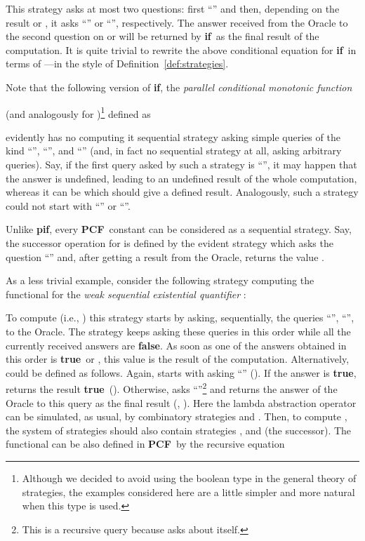 \documentclass[fleqn]{LMCS}
\theoremstyle{plain}\newtheorem{satz}[thm]{Satz}
\theoremstyle{plain}\newtheorem{hyp}[thm]{Hypothesis}
\theoremstyle{plain}\newtheorem{hyps}[thm]{Hypotheses}
\theoremstyle{definition}\newtheorem{note}[thm]{Note}
\newcommand{\PCF}{\mbox{\bf PCF}}
\newcommand{\IF}{\mbox{\bf if}}
\newcommand{\PIF}{\mbox{\bf pif}}
\newcommand{\?}{\mbox{?}}
\newcommand{\false}{\mbox{\bf false}}
\newcommand{\true}{\mbox{\bf true}}
\begin{document}
This strategy asks at most two questions: 
first ``'' and then, depending on the result 
 or ,
it asks ``'' or ``'', respectively. 
The answer received from the Oracle to the second question 
on  or  will be 
returned by \IF\ as the final result of the computation. 
It is quite trivial to rewrite the above conditional equation for \IF\ 
in terms of ---in the style of Definition~\ref{def:strategies}. 

Note that the following version of \IF, the
\emph{parallel conditional monotonic function} 

(and analogously for )\footnote{Although we decided to avoid using the boolean type  in 
the general theory of strategies, the examples considered here are a little simpler 
and more natural when this type is used. 
} 
defined as
 
evidently has no computing it sequential strategy asking simple queries 
of the kind ``'', ``'', and ``'' (and, in fact 
no sequential strategy at all, asking arbitrary queries). 
Say, if the first query asked by such a strategy is ``'', 
it may happen that the answer is undefined, leading to an undefined 
result of the whole computation, whereas it can be  which should 
give a defined result. Analogously, such a strategy could not start with 
``'' or ``''. 


Unlike \PIF, every \PCF\ constant 
can be considered as a sequential strategy. 
Say, the successor operation  for  
is defined by the evident strategy which asks the question ``'' and, 
after getting a result  from the Oracle, returns the 
value . 

As a less trivial example, consider the following strategy   
computing the functional for 
the \emph{weak sequential existential quantifier} 
: 

To compute  (i.e., ) 
this strategy starts by asking, sequentially, the queries  
\linebreak
``'', ``'',  to the Oracle.
The strategy keeps asking these queries in this order 
while all the currently received answers are \false. 
As soon as one of the answers obtained in this order 
is \true\ or , this value 
is the result of the computation. 
Alternatively,  could be defined as follows. 
Again,  starts with asking 
``'' (). If the answer is \true, 
 returns the result \true\ (). 
Otherwise,   
asks ``''\footnote{This is a recursive query because  asks about itself. 
}
and returns the answer of the Oracle to this query as the final result 
(, ). 
Here the lambda abstraction operator can be simulated, as usual, 
by combinatory strategies  and . 
Then, to compute , the system of strategies should also 
contain strategies , and  (the successor).
The functional  can be also 
defined in \PCF\ by the recursive equation 
\end{document}
